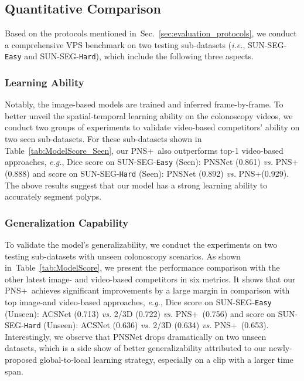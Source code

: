 \documentclass[default,iicol]{sn-jnl}
\theoremstyle{thmstyleone}
\theoremstyle{thmstyletwo}
\theoremstyle{thmstylethree}
\newcommand{\tabref}[1]{Table~\ref{#1}}
\newcommand{\secref}[1]{Sec.~\ref{#1}}
\def\ie{\emph{i.e.}}
\def\eg{\emph{e.g.}}
\def\ourmodel{PNS+}
\def\ourdataset{SUN-SEG}
\begin{document}
\subsection{Quantitative Comparison}\label{sec:benchmark}
Based on the protocols mentioned in~\secref{sec:evaluation_protocols}, we conduct a comprehensive VPS benchmark on two testing sub-datasets (\ie, \ourdataset-\texttt{Easy} and \ourdataset-\texttt{Hard}), which include the following three aspects.

\subsubsection{Learning Ability}
Notably, the image-based models are trained and inferred frame-by-frame.
To better unveil the spatial-temporal learning ability on the colonoscopy videos, we conduct two groups of experiments to validate video-based competitors' ability on two seen sub-datasets.
For these sub-datasets shown in \tabref{tab:ModelScore_Seen}, our \ourmodel~also outperforms top-1 video-based approaches, \eg, Dice score on \ourdataset-\texttt{Easy} (Seen): PNSNet (0.861) \textit{vs.} \ourmodel (0.888) and  score on \ourdataset-\texttt{Hard} (Seen): PNSNet (0.892) \textit{vs.} \ourmodel (0.929).
The above results suggest that our model has a strong learning ability to accurately segment polyps.

\subsubsection{Generalization Capability}
To validate the model's generalizability, we conduct the experiments on two testing sub-datasets with unseen colonoscopy scenarios.
As shown in~\tabref{tab:ModelScore}, we present the performance comparison with the other latest image- and video-based competitors in six metrics.
It shows that our \ourmodel~achieves significant improvements by a large margin in comparison with top image-and video-based approaches, \eg, Dice score on \ourdataset-\texttt{Easy} (Unseen): ACSNet (0.713) \textit{vs.} 2/3D (0.722) \textit{vs.} \ourmodel~(0.756) and  score on \ourdataset-\texttt{Hard} (Unseen): ACSNet (0.636) \textit{vs.} 2/3D (0.634) \textit{vs.} \ourmodel~(0.653).
Interestingly, we observe that PNSNet drops dramatically on two unseen datasets, which is a side show of better generalizability attributed to our newly-proposed global-to-local learning strategy, especially on a clip with a larger time span.
\end{document}

